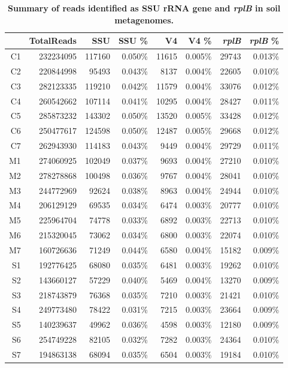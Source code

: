 \documentclass[]{msu-thesis}
\begin{document}
\begin{table}[htbp]
  \centering
  \caption[Summary of reads identified as SSU rRNA gene and \textit{\textit{rplB}} in soil metagenomes]{\textbf{Summary of reads identified as SSU rRNA gene and \textit{\textit{rplB}} in soil metagenomes.}}
    \begin{tabular}{|rrrrrrrr|}
    \toprule
          & TotalReads & SSU   & SSU \% & V4    & V4 \% & \textit{rplB}  & \textit{rplB} \% \\
    \midrule
    C1    & 232234095 & 117160 & 0.050\% & 11615 & 0.005\% & 29743 & 0.013\% \\
    C2    & 220844998 & 95493 & 0.043\% & 8137  & 0.004\% & 22605 & 0.010\% \\
    C3    & 282123335 & 119210 & 0.042\% & 11579 & 0.004\% & 33076 & 0.012\% \\
    C4    & 260542662 & 107114 & 0.041\% & 10295 & 0.004\% & 28427 & 0.011\% \\
    C5    & 285873232 & 143302 & 0.050\% & 13520 & 0.005\% & 33428 & 0.012\% \\
    C6    & 250477617 & 124598 & 0.050\% & 12487 & 0.005\% & 29668 & 0.012\% \\
    C7    & 262943930 & 114183 & 0.043\% & 9449  & 0.004\% & 29729 & 0.011\% \\
    M1    & 274060925 & 102049 & 0.037\% & 9693  & 0.004\% & 27210 & 0.010\% \\
    M2    & 278278868 & 100498 & 0.036\% & 9767  & 0.004\% & 28041 & 0.010\% \\
    M3    & 244772969 & 92624 & 0.038\% & 8963  & 0.004\% & 24944 & 0.010\% \\
    M4    & 206129129 & 69535 & 0.034\% & 6474  & 0.003\% & 20777 & 0.010\% \\
    M5    & 225964704 & 74778 & 0.033\% & 6892  & 0.003\% & 22713 & 0.010\% \\
    M6    & 215320045 & 73062 & 0.034\% & 6800  & 0.003\% & 22074 & 0.010\% \\
    M7    & 160726636 & 71249 & 0.044\% & 6580  & 0.004\% & 15182 & 0.009\% \\
    S1    & 192776425 & 68080 & 0.035\% & 6481  & 0.003\% & 19262 & 0.010\% \\
    S2    & 143660127 & 57229 & 0.040\% & 5469  & 0.004\% & 13270 & 0.009\% \\
    S3    & 218743879 & 76368 & 0.035\% & 7210  & 0.003\% & 21421 & 0.010\% \\
    S4    & 249773480 & 78422 & 0.031\% & 7215  & 0.003\% & 23664 & 0.009\% \\
    S5    & 140239637 & 49962 & 0.036\% & 4598  & 0.003\% & 12180 & 0.009\% \\
    S6    & 254749228 & 82105 & 0.032\% & 7282  & 0.003\% & 24364 & 0.010\% \\
    S7    & 194863138 & 68094 & 0.035\% & 6504  & 0.003\% & 19184 & 0.010\% \\
    \bottomrule
    \end{tabular}%
  \label{tab:S3}%
\end{table}%
\end{document}

